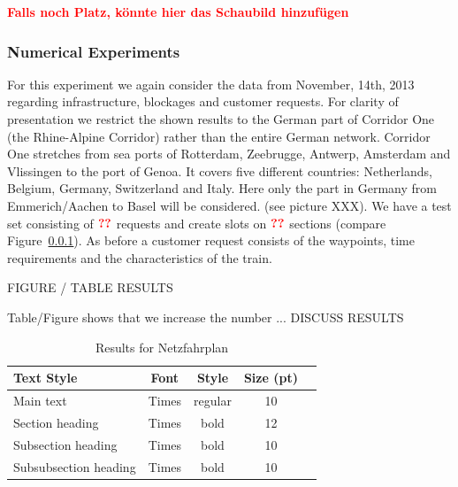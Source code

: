\textbf{\textcolor{red}{Falls noch Platz, könnte hier das Schaubild hinzufügen}}

\subsubsection{Numerical Experiments}
For this experiment we again consider the data from November, 14th, 2013 regarding infrastructure, blockages and customer requests. For clarity of presentation we restrict the shown results to the German part of Corridor One (the Rhine-Alpine Corridor) \cite{} rather than the entire German network. Corridor One stretches from sea ports of Rotterdam, Zeebrugge, Antwerp, Amsterdam and Vlissingen to the port of Genoa. It covers five different countries: Netherlands, Belgium, Germany, Switzerland and Italy. Here only the part in Germany from Emmerich/Aachen to Basel will be considered. (see picture XXX). We have a test set consisting of $\textbf{\textcolor{red}{??}}$ requests and create slots on $\textbf{\textcolor{red}{??}}$ sections (compare Figure~\ref{}).
As before a customer request consists of the waypoints, time requirements and the
characteristics of the train.


FIGURE / TABLE RESULTS

Table/Figure shows that we increase the number ... DISCUSS RESULTS
%
\begin{table}[h]
	\centering
	\caption{Results for Netzfahrplan}
	\label{tab:result_Netzfpl}
	\begin{tabular}{lcccc} \hline
		\textbf{Text Style}   & \textbf{Font} & \textbf{Style} & \textbf{Size (pt)} \\ \hline
		Main text             & Times         & regular        & 10                 \\
		Section heading       & Times         & bold           & 12                 \\
		Subsection heading    & Times         & bold           & 10                 \\
		Subsubsection heading & Times         & bold           & 10                 \\ \hline
	\end{tabular}
\end{table}
\par

